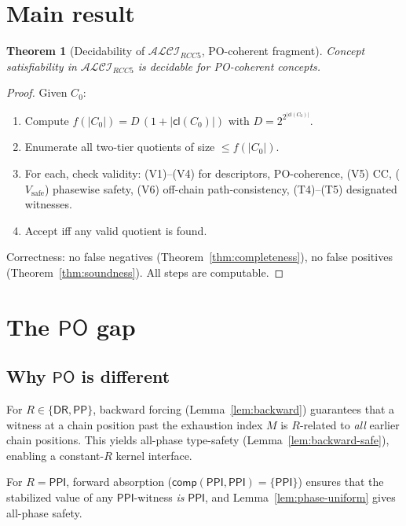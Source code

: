 \documentclass[a4paper,11pt]{article}
\newtheorem{theorem}{Theorem}[section]
\theoremstyle{definition}
\newcommand{\ALCIRCC}[1]{\ensuremath{\mathcal{ALCI}_{\mathit{RCC#1}}}}
\newcommand{\DR}{\ensuremath{\mathsf{DR}}}
\newcommand{\PO}{\ensuremath{\mathsf{PO}}}
\newcommand{\PP}{\ensuremath{\mathsf{PP}}}
\newcommand{\PPI}{\ensuremath{\mathsf{PPI}}}
\newcommand{\comp}{\ensuremath{\mathsf{comp}}}
\newcommand{\cl}{\ensuremath{\mathsf{cl}}}
\begin{document}
\section{Main result}\label{sec:decidability}

\begin{theorem}[Decidability of $\ALCIRCC{5}$, PO-coherent fragment]
\label{thm:decidability}
Concept satisfiability in $\ALCIRCC{5}$ is decidable for PO-coherent
concepts.
\end{theorem}

\begin{proof}
Given $C_0$:
\begin{enumerate}
\item Compute $f(|C_0|) = D\,(1 + |\cl(C_0)|)$ with
  $D = 2^{2^{|\cl(C_0)|}}$.
\item Enumerate all two-tier quotients of size $\le f(|C_0|)$.
\item For each, check validity: (V1)--(V4) for descriptors,
  PO-coherence, (V5) CC, ($V_{\mathrm{safe}}$) phasewise safety,
  (V6) off-chain path-consistency, (T4)--(T5) designated witnesses.
\item Accept iff any valid quotient is found.
\end{enumerate}
Correctness: no false negatives
(Theorem~\ref{thm:completeness}), no false positives
(Theorem~\ref{thm:soundness}).  All steps are computable.
\end{proof}


\section{The $\PO$ gap}\label{sec:po-gap}

\subsection{Why $\PO$ is different}

For $R \in \{\DR, \PP\}$, backward forcing
(Lemma~\ref{lem:backward}) guarantees that a witness at a chain
position past the exhaustion index $M$ is $R$-related to
\emph{all} earlier chain positions.  This yields all-phase
type-safety (Lemma~\ref{lem:backward-safe}), enabling a
constant-$R$ kernel interface.

For $R = \PPI$, forward absorption ($\comp(\PPI, \PPI) = \{\PPI\}$)
ensures that the stabilized value of any $\PPI$-witness \emph{is}
$\PPI$, and Lemma~\ref{lem:phase-uniform} gives all-phase safety.
\end{document}
